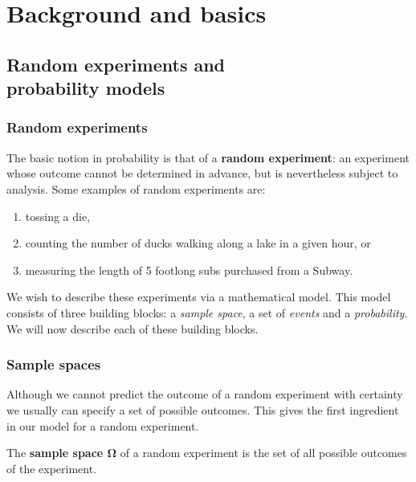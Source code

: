 
\part{Background and basics}



\chapter[Random experiments and probability models]{Random experiments and \\ probability models}

\section{Random experiments}

The basic notion in probability is that of a 
\textbf{random experiment}: an experiment whose outcome 
cannot be determined in advance, but is nevertheless 
subject to analysis. Some examples of random experiments are: 

\begin{enumerate}
    \item tossing a die, 
    \item counting the number of ducks walking along a lake in a given hour, or
    \item measuring the length of 5 footlong subs purchased from a Subway.
\end{enumerate}

We wish to describe these experiments via a mathematical 
model. This model consists of three building blocks: 
a \textit{sample space}, a set of \textit{events} and 
a \textit{probability}. We will now describe each of these building blocks. 

\section{Sample spaces}

Although we cannot predict the outcome of a random experiment 
with certainty we usually can specify a set of possible outcomes. 
This gives the first ingredient in our model for a random experiment. 

\begin{definition}\label{defn:sample space}
    The \textbf{sample space $\boldsymbol\Omega$} of a random experiment 
    is the set of all possible outcomes of the experiment.
\end{definition}

